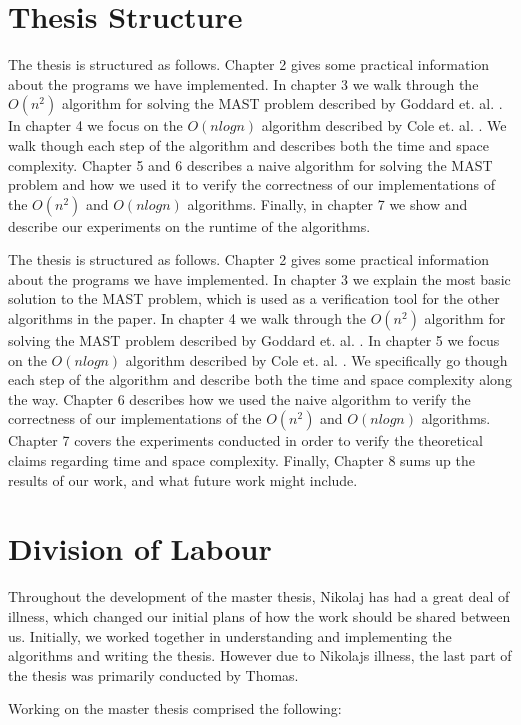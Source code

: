 \section{Thesis Structure}
The thesis is structured as follows. Chapter 2 gives some practical information about the programs we have implemented. 
In chapter 3 we walk through the $O(n^2)$ algorithm for solving the MAST problem described by Goddard et. al. \cite{nsquared}. In chapter 4 we focus on the $O(nlogn)$ algorithm described by Cole et. al. \cite{nlogn}. We walk though each step of the algorithm and describes both the time and space complexity. Chapter 5 and 6 describes a naive algorithm for solving the MAST problem and how we used it to verify the correctness of our implementations of the $O(n^2)$ and $O(nlogn)$ algorithms. Finally, in chapter 7 we show and describe our experiments on the runtime of the algorithms.


The thesis is structured as follows. Chapter 2 gives some practical information about the programs we have implemented. In chapter 3 we explain the most basic solution to the MAST problem, which is used as a verification tool for the other algorithms in the paper. In chapter 4 we walk through the $O(n^2)$ algorithm for solving the MAST problem described by Goddard et. al. \cite{nsquared}. In chapter 5 we focus on the $O(nlogn)$ algorithm described by Cole et. al. \cite{nlogn}. We specifically go though each step of the algorithm and describe both the time and space complexity along the way. Chapter 6 describes how we used the naive algorithm to verify the correctness of our implementations of the $O(n^2)$ and $O(nlogn)$ algorithms. Chapter 7 covers the experiments conducted in order to verify the theoretical claims regarding time and space complexity. Finally, Chapter 8 sums up the results of our work, and what future work might include.

\section{Division of Labour}
Throughout the development of the master thesis, Nikolaj has had a great deal of illness, which changed our initial plans of how the work should be shared between us. Initially, we worked together in understanding and implementing the algorithms and writing the thesis. However due to Nikolajs illness, the last part of the thesis was primarily conducted by Thomas.

Working on the master thesis comprised the following:

